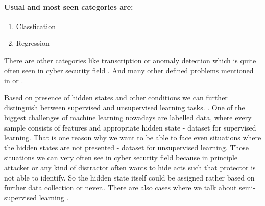 
\paragraph{Usual and most seen categories are:}
\begin{enumerate}
    \item Classfication 
    \item Regression 
\end{enumerate}

There are other categories like transcription \cite{GoodBengCour16} or anomaly detection \cite{Chandola2009} which is quite often seen in cyber security field . And many other defined problems mentioned in \cite{GoodBengCour16} or \cite{zhang2020dive}.

Based on presence of hidden states and other conditions we can further distinguish between supervised and unsupervised learning tasks. \cite{zhang2020dive}. One of the biggest challenges of machine learning nowadays are labelled data, where every sample consists of features and appropriate hidden state - dataset for supervised learning. That is one reason why we want to be able to face even situations where the hidden states are not presented - dataset for unsupervised learning.  Those situations we can very often see in cyber security field because in principle attacker or any kind of distractor often wants to hide acts such that protector is not able to identify. So the hidden state itself could be assigned rather based on further data collection or never..
There are also cases where we talk about semi-supervised learning .


